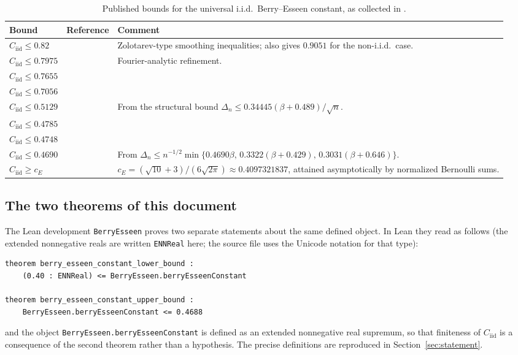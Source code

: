 \documentclass[10pt,a4paper]{article}
\theoremstyle{plain}
\theoremstyle{definition}
\newcommand{\Cii}{C_{\mathrm{iid}}}
\newcommand{\lean}[1]{\texttt{#1}}
\newcommand{\file}[1]{\texttt{#1}}
\begin{document}
\begin{table}[ht]
\centering
\begin{tabular}{@{}llp{7.4cm}@{}}
\toprule
Bound & Reference & Comment \\
\midrule
$\Cii \le 0.82$   & \cite{Zolotarev1967} & Zolotarev-type smoothing inequalities;
  \cite{Zolotarev1967} also gives $0.9051$ for the non-i.i.d.\ case. \\
$\Cii \le 0.7975$ & \cite{vanBeek1972}   & Fourier-analytic refinement. \\
$\Cii \le 0.7655$ & \cite{Shiganov1986}  & \\
$\Cii \le 0.7056$ & \cite{Shevtsova2006} & \\
$\Cii \le 0.5129$ & \cite{KorolevShevtsova2009}
  & From the structural bound $\Delta_n\le 0.34445(\beta+0.489)/\sqrt n$. \\
$\Cii \le 0.4785$ & \cite{Tyurin2009}    & \\
$\Cii \le 0.4748$ & \cite{Shevtsova2011} & \\
$\Cii \le 0.4690$ & \cite{Shevtsova2013}
  & From $\Delta_n\le n^{-1/2}\min\{0.4690\beta,\,0.3322(\beta+0.429),\,
    0.3031(\beta+0.646)\}$. \\
\midrule
$\Cii \ge c_E$    & \cite{Esseen1956}
  & $c_E=(\sqrt{10}+3)/(6\sqrt{2\pi})\approx0.4097321837$, attained
    asymptotically by normalized Bernoulli sums. \\
\bottomrule
\end{tabular}
\caption{Published bounds for the universal i.i.d.\ Berry--Esseen constant,
as collected in \cite{Tao2026}.}
\label{tab:history}
\end{table}

\subsection{The two theorems of this document}

The Lean development \file{BerryEsseen} proves two separate statements about
the same defined object. In Lean they read as follows (the extended nonnegative
reals are written \lean{ENNReal} here; the source file uses the Unicode
notation for that type):
\begin{verbatim}
theorem berry_esseen_constant_lower_bound :
    (0.40 : ENNReal) <= BerryEsseen.berryEsseenConstant

theorem berry_esseen_constant_upper_bound :
    BerryEsseen.berryEsseenConstant <= 0.4688
\end{verbatim}
and the object \lean{BerryEsseen.berryEsseenConstant} is defined as an
extended nonnegative real supremum, so that finiteness of $\Cii$ is a
consequence of the second theorem rather than a hypothesis. The precise
definitions are reproduced in Section~\ref{sec:statement}.
\end{document}

